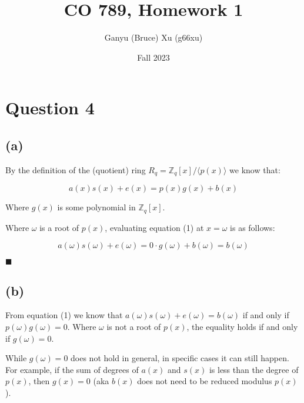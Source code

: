 \documentclass{article}
\title{CO 789, Homework 1}
\author{Ganyu (Bruce) Xu (g66xu)}
\date{Fall 2023}
\begin{document}

\section*{Question 4}

\subsection*{(a)}
By the definition of the (quotient) ring $R_q = \mathbb{Z}_q[x] / \langle p(x) \rangle$ we know that:

\begin{equation}
    a(x)s(x) + e(x) = p(x)g(x) + b(x)
\end{equation}

Where $g(x)$ is some polynomial in $\mathbb{Z}_q[x]$.

Where $\omega$ is a root of $p(x)$, evaluating equation (1) at $x = \omega$ is as follows:

$$
a(\omega)s(\omega) + e(\omega) = 0 \cdot g(\omega) + b(\omega) = b(\omega)
$$

$\blacksquare$

\subsection*{(b)}
From equation (1) we know that $a(\omega)s(\omega) + e(\omega) = b(\omega)$ if and only if $p(\omega)g(\omega) = 0$. Where $\omega$ is not a root of $p(x)$, the equality holds if and only if $g(\omega) = 0$.

While $g(\omega) = 0$ does not hold in general, in specific cases it can still happen. For example, if the sum of degrees of $a(x)$ and $s(x)$ is less than the degree of $p(x)$, then $g(x) = 0$ (aka $b(x)$ does not need to be reduced modulus $p(x)$).
\end{document}
